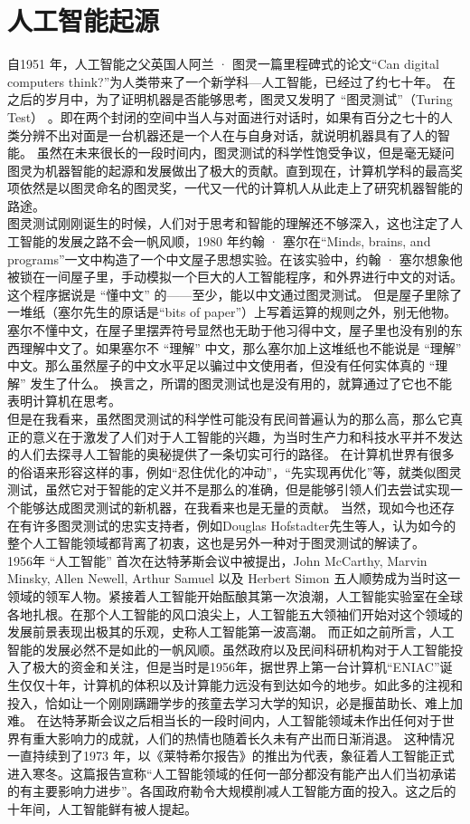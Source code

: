 \documentclass[12pt]{ctexart}
\begin{document}
\section{人工智能起源}
\indent 自1951 年，人工智能之父英国人阿兰 · 图灵一篇里程碑式的论文``Can digital computers think?''\cite{name3}为人类带来了一个新学科—人工智能，已经过了约七十年。
在之后的岁月中，为了证明机器是否能够思考，图灵又发明了 “图灵测试”（Turing Test）\cite{name2} \cite{name4}。即在两个封闭的空间中当人与对面进行对话时，如果有百分之七十的人类分辨不出对面是一台机器还是一个人在与自身对话，就说明机器具有了人的智能。
虽然在未来很长的一段时间内，图灵测试的科学性饱受争议，但是毫无疑问图灵为机器智能的起源和发展做出了极大的贡献。直到现在，计算机学科的最高奖项依然是以图灵命名的图灵奖，一代又一代的计算机人从此走上了研究机器智能的路途。\\
\indent 图灵测试刚刚诞生的时候，人们对于思考和智能的理解还不够深入，这也注定了人工智能的发展之路不会一帆风顺，1980 年约翰 · 塞尔在``Minds, brains, and programs''\cite{name5}一文中构造了一个中文屋子思想实验。在该实验中，约翰 · 塞尔想象他被锁在一间屋子里，手动模拟一个巨大的人工智能程序，和外界进行中文的对话。这个程序据说是 “懂中文” 的——至少，能以中文通过图灵测试。
但是屋子里除了一堆纸（塞尔先生的原话是“bits of paper”）上写着运算的规则之外，别无他物。
塞尔不懂中文，在屋子里摆弄符号显然也无助于他习得中文，屋子里也没有别的东西理解中文了。如果塞尔不 “理解” 中文，那么塞尔加上这堆纸也不能说是 “理解” 中文。那么虽然屋子的中文水平足以骗过中文使用者，但没有任何实体真的 “理解” 发生了什么。
换言之，所谓的图灵测试也是没有用的，就算通过了它也不能表明计算机在思考。\\
\indent 但是在我看来，虽然图灵测试的科学性可能没有民间普遍认为的那么高，那么它真正的意义在于激发了人们对于人工智能的兴趣，为当时生产力和科技水平并不发达的人们去探寻人工智能的奥秘提供了一条切实可行的路径。
在计算机世界有很多的俗语来形容这样的事，例如``忍住优化的冲动''，``先实现再优化''等，就类似图灵测试，虽然它对于智能的定义并不是那么的准确，但是能够引领人们去尝试实现一个能够达成图灵测试的新机器，在我看来也是无量的贡献。
当然，现如今也还存在有许多图灵测试的忠实支持者，例如Douglas Hofstadter先生等人，认为如今的整个人工智能领域都背离了初衷，这也是另外一种对于图灵测试的解读了。\\
\indent 1956年 “人工智能” 首次在达特茅斯会议中被提出，John McCarthy, Marvin Minsky, Allen Newell, Arthur Samuel 以及 Herbert Simon 五人顺势成为当时这一领域的领军人物。紧接着人工智能开始酝酿其第一次浪潮，人工智能实验室在全球各地扎根。在那个人工智能的风口浪尖上，人工智能五大领袖们开始对这个领域的发展前景表现出极其的乐观，史称人工智能第一波高潮。
而正如之前所言，人工智能的发展必然不是如此的一帆风顺。虽然政府以及民间科研机构对于人工智能投入了极大的资金和关注，但是当时是1956年，据世界上第一台计算机``ENIAC''诞生仅仅十年，计算机的体积以及计算能力远没有到达如今的地步。如此多的注视和投入，恰如让一个刚刚蹒跚学步的孩童去学习大学的知识，必是揠苗助长、难上加难。
在达特茅斯会议之后相当长的一段时间内，人工智能领域未作出任何对于世界有重大影响力的成就，人们的热情也随着长久未有产出而日渐消退。
这种情况一直持续到了1973 年，以《莱特希尔报告》的推出为代表，象征着人工智能正式进入寒冬。这篇报告宣称``人工智能领域的任何一部分都没有能产出人们当初承诺的有主要影响力进步''。各国政府勒令大规模削减人工智能方面的投入。这之后的十年间，人工智能鲜有被人提起。
\end{document}
